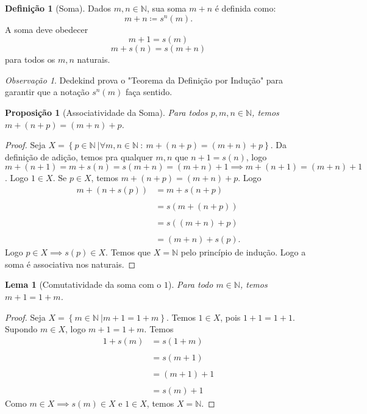 \documentclass{article}
\theoremstyle{plain}
\newtheorem{prop}{Proposição}
\newtheorem{lema}{Lema}
\theoremstyle{definition}
\newtheorem{definicao}{Definição}[section]
\theoremstyle{remark}
\newtheorem{obs}{Observação}[section]
\begin{document}
\begin{definicao}[Soma]
	Dados $m,n\in \mathbb{N}$, sua soma $m+n$ é definida como:$$ m+n \coloneqq s^n(m).$$ A soma deve obedecer \begin{equation} m+1 = s(m)\end{equation} \begin{equation}m +s(n) = s(m+n)\end{equation}  para todos os $m,n$ naturais.
\end{definicao}
\begin{obs}
	Dedekind prova o "Teorema da Definição por Indução" para garantir que a notação $s^n(m)$ faça sentido.
\end{obs}
\begin{prop}[Associatividade da Soma]
	Para todos $p,m,n \in \mathbb{N}$, temos $m+(n+p) = (m+n) +p$.
\end{prop}
\begin{proof}
	Seja $X = \left\{ p \in \mathbb{N} \: | \forall m,n\in \mathbb{N} \: : \: m+(n+p) = (m+n) + p \right\}$. Da definição de adição, temos pra qualquer $m,n$ que $n+1 = s(n)$, logo $m+(n+1)  = m+s(n) = s(m+n) = (m+n) +1 \implies m+(n+1) = (m+n) +1 $. Logo $1\in X$.  Se $p \in X$, temos $m+(n+p) = (m+n) +p $. Logo \begin{align*} 
		m+(n+s(p)) &= m+ s(n+p) \\~\\
		&= s\left(m+(n+p)\right) \\~\\ 
		&= s\left((m+n)+p\right) \\~\\ 
		&= (m+n) + s(p).
	\end{align*}
	Logo $p \in X \implies s(p) \in X$. Temos que $X =  \mathbb{N}$ pelo princípio de indução. Logo a soma é associativa nos naturais.
\end{proof}
\begin{lema}[Comutatividade da soma com o $1$]
	\label{lema1}
	Para todo $m \in \mathbb{N}$, temos $m+1 = 1 +m$.
\end{lema}
\begin{proof}
	Seja $X = \left\{ m \in \mathbb{N} \: |  m+1 = 1+m \right\}$. Temos $1\in X$, pois $1+1 = 1+1$. Supondo $m\in X$, logo $m+1 = 1+m$. Temos \begin{align*} 
		1+ s(m)  &= s(1+m) \\~ \\
		&= s(m+1) \\~\\
		&= (m+1) +1 \\~\\
		&= s(m)+1
	\end{align*}
	Como $m\in X \implies s(m) \in X$ e $1\in X$, temos $X= \mathbb{N}$.
\end{proof}
\end{document}
